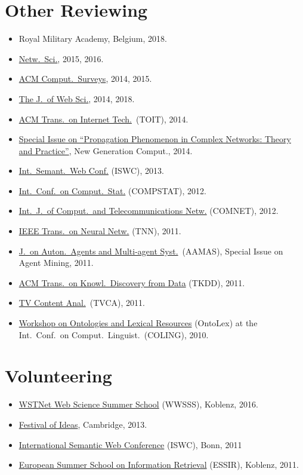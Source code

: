 \documentclass[line,mm]{res}
\newcounter{x}
\newcounter{y}
\newcounter{z}
\begin{document}
\begin{resume}
\section{Other Reviewing}
\begin{itemize}
\item Royal Military Academy, Belgium, 2018. 
\item \href{http://journals.cambridge.org/action/displayJournal?jid=NWS}{Netw.\ Sci.}, 2015, 2016.
\item \href{http://surveys.acm.org/}{ACM Comput.\ Surveys}, 2014, 2015. 
\item \href{http://www.webscience-journal.net}{The J.\ of Web Sci.}, 2014, 2018. 
\item \href{http://toit.acm.org/}{ACM Trans.\ on Internet
  Tech.}\ (TOIT), 2014.  
\item \href{http://www.ii.pwr.wroc.pl/~krol/eng_EPP.htm}{Special
  Issue on ``Propagation Phenomenon in Complex Networks:  Theory and
  Practice''}, New Generation Comput., 2014. 
\item \href{http://iswc2013.semanticweb.org/}{Int.\ Semant.\ Web Conf.}
  (ISWC), 2013.  
\item \href{http://www.compstat2012.org/}{Int.\ Conf.\ on Comput.\ Stat.} (COMPSTAT), 2012.  
\item
  \href{http://www.journals.elsevier.com/computer-networks/}{Int.\ J.\ of
    Comput.\ and Telecommunications Netw.} (COMNET), 2012. 
\item \href{http://ieee-cis.org/pubs/tnn/}{IEEE Trans.\ on Neural
  Netw.} (TNN), 2011.   
\item
  \href{http://www.springer.com/computer/ai/journal/10458}{J.\ on Auton.\ Agents and Multi-agent Syst.}\ (AAMAS), Special Issue on Agent Mining,
  2011. 
\item \href{http://tkdd.cs.uiuc.edu/}{ACM Trans.\ on Knowl.\ Discovery from Data} (TKDD), 2011.  
\item \href{http://mklab.iti.gr/tvca/}{TV Content Anal.}\ (TVCA), 2011.
\item \href{http://www.loa-cnr.it/ontolex2010}{Workshop on Ontologies
  and Lexical Resources} (OntoLex) at the Int.\ Conf.\ on Comput.\ Linguist.\ (COLING), 2010. 
\end{itemize}

\section{Volunteering}
\begin{itemize}
  \item \href{http://wwsss16.webscience.org/}{WSTNet Web Science Summer School} (WWSSS), Koblenz, 2016. 
  \item \href{http://www.festivalofideas.cam.ac.uk/}{Festival of Ideas}, Cambridge, 2013. 
  \item \href{http://iswc2011.semanticweb.org/}{International Semantic Web Conference} (ISWC), Bonn, 2011
  \item \href{https://essir.uni-koblenz.de/}{European Summer School on Information Retrieval} (ESSIR), Koblenz, 2011. 
\end{itemize}


\end{resume}
\end{document}
